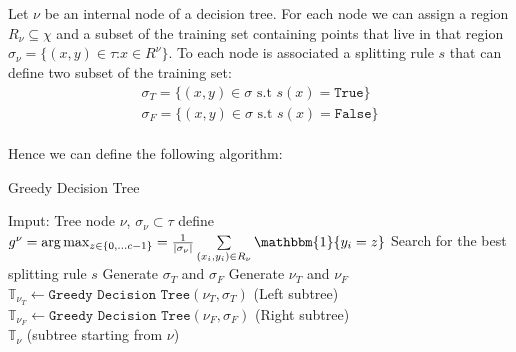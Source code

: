 \\
\\
Let \(\nu\) be an internal node of a decision tree. For each node we can assign a region \(R_\nu \subseteq \chi \) and a subset of the training  set containing points that live in that region \(\sigma_\nu = \{(x, y) \in \tau
\text{:}  x \in R^\nu\}\). To each node is associated a splitting rule \(s\) that can define two subset of the training set:
\begin{eqnarray*}
    \sigma_T = \{(x, y) \in \sigma \text{ s.t } s(x) = \texttt{True}\}\\
    \sigma_F = \{(x, y) \in \sigma \text{ s.t } s(x) = \texttt{False}\}
\end{eqnarray*}
\\
Hence we can define the following algorithm:
\begin{algorithm}[H]\caption{Greedy Decision Tree}
    \label{algo:greedy}
    \begin{algorithmic}
    \State Imput: Tree node \(\nu\), \(\sigma_\nu \subset \tau\)
    \State define \(g^\nu = \arg\max_{z \in \{0, \dots c- 1\}} = \frac{1}{| \sigma_\nu |}  \sum \limits_{(x_i, y_i) \in R_\nu}^{} \mathbbm{1}\{y_i = z\} \)
    \EndIf
    \State Search for the best splitting rule \(s\)
    \State Generate \(\sigma_T\) and \(\sigma_F\)
    \State Generate \(\nu_T\) and \(\nu_F\)
    \State \(\mathbb{T}_{\nu_T} \gets \texttt{Greedy Decision Tree}(\nu_T, \sigma_T)\) (Left subtree)
    \State \(\mathbb{T}_{\nu_F} \gets \texttt{Greedy Decision Tree}(\nu_F, \sigma_F)\) (Right subtree)\\
    \Return \(\mathbb{T}_\nu\) (subtree starting from \(\nu\))
    \end{algorithmic}            
\end{algorithm}

